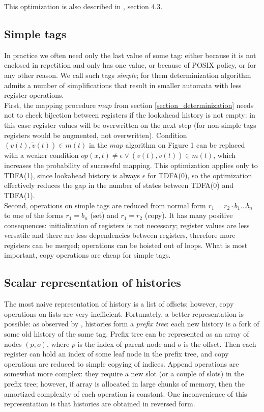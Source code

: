 \documentclass{article}
\newcommand{\Xin}{\!\in\!}
\newcommand{\Xeq}{\!=\!}
\theoremstyle{definition}
\begin{document}
\begin{multicols}{2}
This optimization is also described in \cite{Lau01}, section 4.3.

\subsection*{Simple tags}

In practice we often need only the last value of some tag:
either because it is not enclosed in repetition and only has one value, or because of POSIX policy, or for any other reason.
We call such tags \emph{simple};
for them determinization algorithm admits a number of simplifications
that result in smaller automata with less register operations.
\\

First, the mapping procedure $map$ from section \ref{section_determinization}
needs not to check bijection between registers if the lookahead history is not empty:
in this case register values will be overwritten on the next step
(for non-simple tags registers would be augmented, not overwritten).
Condition $(v(t), \widetilde{v}(t)) \Xin m(t)$ in the $map$ algorithm on Figure 1
can be replaced with a weaker condition $op(x, t) \!\neq\! \epsilon \vee (v(t), \widetilde{v}(t)) \Xin m(t)$,
which increases the probability of successful mapping.
This optimization applies only to TDFA(1), since lookahead history is always $\epsilon$ for TDFA(0),
so the optimization effectively reduces the gap in the number of states between TDFA(0) and TDFA(1).
\\

Second, operations on simple tags are reduced from normal form $r_1 \Xeq r_2 \cdot b_1 \dots b_n$
to one of the forms $r_1 \Xeq b_n$ (set) and $r_1 \Xeq r_2$ (copy).
It has many positive consequences:
initialization of registers is not necessary;
register values are less versatile and there are less dependencies between registers, therefore more registers can be merged;
operations can be hoisted out of loops.
What is most important, copy operations are cheap for simple tags.

\subsection*{Scalar representation of histories}

The most naive representation of history is a list of offsets;
however, copy operations on lists are very inefficient.
Fortunately, a better representation is possible: as observed by \cite{Kar14}, histories form a \emph{prefix tree}:
each new history is a fork of some old history of the same tag.
Prefix tree can be represented as an array of nodes $(p, o)$,
where $p$ is the index of parent node and $o$ is the offset.
Then each register can hold an index of some leaf node in the prefix tree,
and copy operations are reduced to simple copying of indices.
Append operations are somewhat more complex: they require a new slot (or a couple of slots) in the prefix tree;
however, if array is allocated in large chunks of memory,
then the amortized complexity of each operation is constant.
One inconvenience of this representation is that histories are obtained in reversed form.


\end{multicols}
\end{document}
